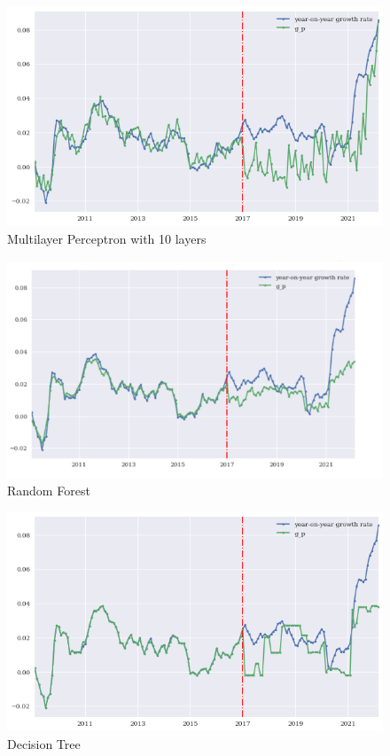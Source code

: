 \documentclass[reqno]{amsart}
\theoremstyle{definition}
\begin{document}
\begin{figure}[h]
\centering
\caption{Multilayer Perceptron with 10 layers}
\includegraphics[scale=0.8]{Multilayer Perceptron.png}
\end{figure}

\begin{figure}[h]
\centering
\caption{Random Forest}
\includegraphics[scale=0.8]{Random Forest.png}
\end{figure}

\begin{figure}[h]
\centering
\caption{Decision Tree}
\includegraphics[scale=0.78]{Decision Tree.png}
\end{figure}
\end{document}

